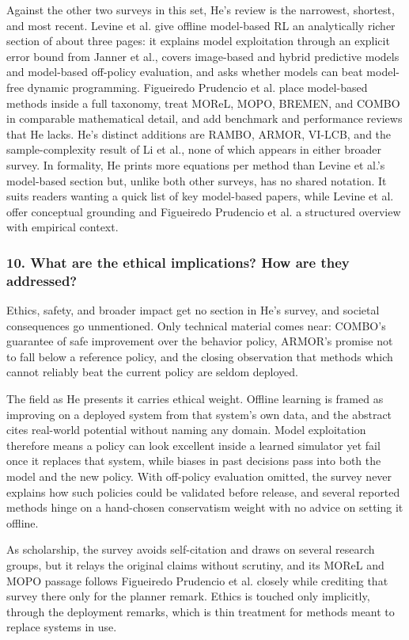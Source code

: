 \documentclass[11pt]{article}
\newcommand{\question}[1]{\subsubsection*{#1}}
\begin{document}
Against the other two surveys in this set, He's review is the narrowest, shortest, and most recent. Levine et al. give offline model-based RL an analytically richer section of about three pages: it explains model exploitation through an explicit error bound from Janner et al., covers image-based and hybrid predictive models and model-based off-policy evaluation, and asks whether models can beat model-free dynamic programming. Figueiredo Prudencio et al. place model-based methods inside a full taxonomy, treat MOReL, MOPO, BREMEN, and COMBO in comparable mathematical detail, and add benchmark and performance reviews that He lacks. He's distinct additions are RAMBO, ARMOR, VI-LCB, and the sample-complexity result of Li et al., none of which appears in either broader survey. In formality, He prints more equations per method than Levine et al.'s model-based section but, unlike both other surveys, has no shared notation. It suits readers wanting a quick list of key model-based papers, while Levine et al. offer conceptual grounding and Figueiredo Prudencio et al. a structured overview with empirical context.

\question{10. What are the ethical implications? How are they addressed?}

Ethics, safety, and broader impact get no section in He's survey, and societal consequences go unmentioned. Only technical material comes near: COMBO's guarantee of safe improvement over the behavior policy, ARMOR's promise not to fall below a reference policy, and the closing observation that methods which cannot reliably beat the current policy are seldom deployed.

The field as He presents it carries ethical weight. Offline learning is framed as improving on a deployed system from that system's own data, and the abstract cites real-world potential without naming any domain. Model exploitation therefore means a policy can look excellent inside a learned simulator yet fail once it replaces that system, while biases in past decisions pass into both the model and the new policy. With off-policy evaluation omitted, the survey never explains how such policies could be validated before release, and several reported methods hinge on a hand-chosen conservatism weight with no advice on setting it offline.

As scholarship, the survey avoids self-citation and draws on several research groups, but it relays the original claims without scrutiny, and its MOReL and MOPO passage follows Figueiredo Prudencio et al. closely while crediting that survey there only for the planner remark. Ethics is touched only implicitly, through the deployment remarks, which is thin treatment for methods meant to replace systems in use.
\end{document}
